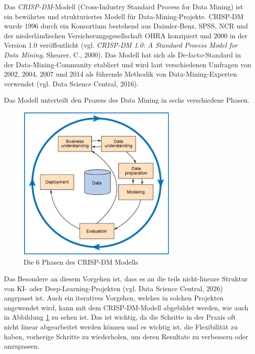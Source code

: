 Das \textit{CRISP-DM}-Modell (Cross-Industry Standard Process for Data Mining) ist ein bewährtes und strukturiertes Modell für Data-Mining-Projekte. 
CRISP-DM wurde 1996 durch ein Konsortium bestehend aus Daimler-Benz, SPSS, NCR und der niederländischen Versicherungsgesellschaft OHRA konzipiert und 2000 in der Version 1.0 veröffentlicht (vgl. \textit{CRISP-DM 1.0: A Standard Process Model for Data Mining}, Shearer, C., 2000).
Das Modell hat sich als De-facto-Standard in der Data-Mining-Community etabliert und wird laut verschiedenen Umfragen von 2002, 2004, 2007 und 2014 als führende Methodik von Data-Mining-Experten verwendet (vgl. Data Science Central, 2016).

Das Modell unterteilt den Prozess des Data Mining in sechs verschiedene Phasen.

\begin{figure}[ht]
    \centering
    \includegraphics[width=0.7\textwidth]{figures/crispdm.png}
    \caption{Die 6 Phasen des CRISP-DM Modells}
    \label{fig:crispdm}
\end{figure}

Das Besondere an diesem Vorgehen ist, dass es an die teils nicht-lineare Struktur von KI- oder Deep-Learning-Projekten (vgl. Data Science Central, 2026) angepasst ist. Auch ein iteratives Vorgehen, welches in solchen Projekten angewendet wird, kann mit dem CRISP-DM-Modell abgebildet werden, wie auch in Abbildung \ref{fig:crispdm} zu sehen ist. Das ist wichtig, da die Schritte in der Praxis oft nicht linear abgearbeitet werden können und es wichtig ist, die Flexibilität zu haben, vorherige Schritte zu wiederholen, um deren Resultate zu verbessern oder anzupassen.


